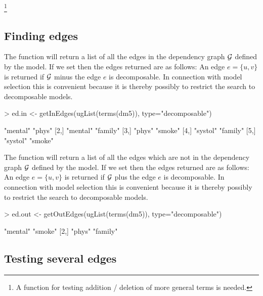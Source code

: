 \documentclass[12pt]{article}
\begin{document}
\footnote{A function for testing addition / deletion of more general
  terms is needed.}



\subsection{Finding edges}
\label{sec:xxx}

The  function will return a list of all the edges
in the dependency graph ${\cal G}$ defined by the model. If we set
 then the edges returned are as follows: An
edge $e=\{u,v\}$ is returned if ${\cal G}$ minus the edge $e$ is
decomposable. In connection with model selection this is convenient
because it is thereby possibly to restrict the search to decomposable
models.

\begin{Schunk}
\begin{Sinput}
> ed.in <- getInEdges(ugList(terms(dm5)), type="decomposable")
\end{Sinput}
\begin{Soutput}
     [,1]     [,2]    
[1,] "mental" "phys"  
[2,] "mental" "family"
[3,] "phys"   "smoke" 
[4,] "systol" "family"
[5,] "systol" "smoke" 
\end{Soutput}
\end{Schunk}

The  function will return a list of all the edges
which are not in the dependency graph ${\cal G}$ defined by the model. If we set
 then the edges returned are as follows: An
edge $e=\{u,v\}$ is returned if ${\cal G}$ plus the edge $e$ is
decomposable. In connection with model selection this is convenient
because it is thereby possibly to restrict the search to decomposable
models.


\begin{Schunk}
\begin{Sinput}
> ed.out <- getOutEdges(ugList(terms(dm5)), type="decomposable")
\end{Sinput}
\begin{Soutput}
     [,1]     [,2]    
[1,] "mental" "smoke" 
[2,] "phys"   "family"
\end{Soutput}
\end{Schunk}


\subsection{Testing several edges}
\label{sec:labeledges}
\end{document}
